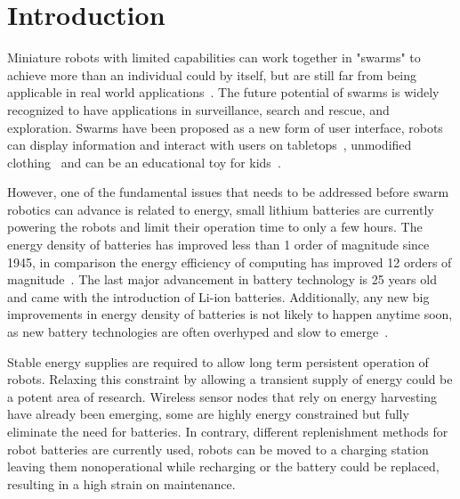 \chapter{Introduction}
\label{chp:introduction}




Miniature robots with limited capabilities can work together in "swarms" to achieve more than an individual could by itself, but are still far from being applicable in real world applications~\cite{barca_sekercioglu_2013}.
The future potential of swarms is widely recognized to have applications in surveillance, search and rescue, and exploration.
Swarms have been proposed as a new form of user interface, robots can display information and interact with users on tabletops~\cite{legoc_uist_2016}, unmodified clothing~\cite{dementyev_uist_2016} and can be an educational toy for kids~\cite{sony_toio_2017}.
\hfill \break


However, one of the fundamental issues that needs to be addressed before swarm robotics can advance is related to energy, small lithium batteries are currently powering the robots and limit their operation time to only a few hours. 
The energy density of batteries has improved less than 1 order of magnitude since 1945, in comparison the energy efficiency of computing has improved 12 orders of magnitude~\cite{patel_pvc_2017}.
The last major advancement in battery technology is 25 years old and came with the introduction of Li-ion batteries.
Additionally, any new big improvements in energy density of batteries is not likely to happen anytime soon, as new battery technologies are often overhyped and slow to emerge~\cite{zachary_spec_2016}.
\hfill \break



Stable energy supplies are required to allow long term persistent operation of robots.
Relaxing this constraint by allowing a transient supply of energy could be a potent area of research.
Wireless sensor nodes that rely on energy harvesting have already been emerging, some are highly energy constrained but fully eliminate the need for batteries. %
In contrary, different replenishment methods for robot batteries are currently used, robots can be moved to a charging station leaving them nonoperational while recharging or the battery could be replaced, resulting in a high strain on maintenance.

